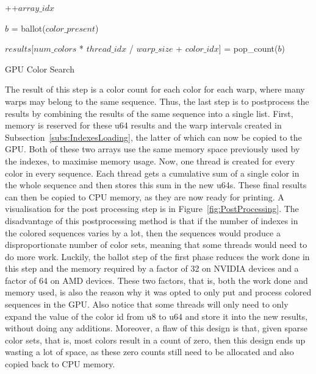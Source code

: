 \begin{algorithm}
{{       {\newline

        ++$\mathit{array\_idx}$
      }
    }

    $b$ = ballot($\mathit{color\_present}$)

     {\newline
      $\mathit{results}$[$\mathit{num\_colors}$ * $\mathit{thread\_idx}$ / $\mathit{warp\_size}$ + $\mathit{color\_idx}$] = pop\_count($b$)
    }

  }

  \caption{GPU Color Search}\label{alg:GpuColorSearch}
\end{algorithm}

The result of this step is a color count for each color for each warp, where many warps may belong to the same sequence.
Thus, the last step is to postprocess the results by combining the results of the same sequence into a single list.
First, memory is reserved for these u64 results and the warp intervals created in Subsection~\ref{subs:IndexesLoading}, the latter of which can now be copied to the GPU.
Both of these two arrays use the same memory space previously used by the indexes, to maximise memory usage.
Now, one thread is created for every color in every sequence.
Each thread gets a cumulative sum of a single color in the whole sequence and then stores this sum in the new u64s.
These final results can then be copied to CPU memory, as they are now ready for printing.
A visualisation for the post processing step is in Figure~\ref{fig:PostProcessing}.
The disadvantage of this postprocessing method is that if the number of indexes in the colored sequences varies by a lot, then the sequences would produce a disproportionate number of color sets, meaning that some threads would need to do more work.
Luckily, the ballot step of the first phase reduces the work done in this step and the memory required by a factor of 32 on NVIDIA devices and a factor of 64 on AMD devices.
These two factors, that is, both the work done and memory used, is also the reason why it was opted to only put and process colored sequences in the GPU.
Also notice that some threads will only need to only expand the value of the color id from u8 to u64 and store it into the new results, without doing any additions.
Moreover, a flaw of this design is that, given sparse color sets, that is, most colors result in a count of zero, then this design ends up wasting a lot of space, as these zero counts still need to be allocated and also copied back to CPU memory.

